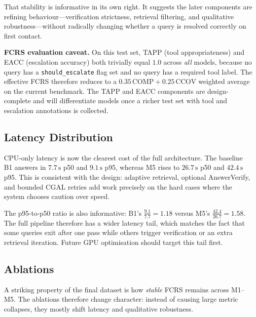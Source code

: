 \documentclass[11pt,a4paper,twocolumn]{article}
\begin{document}
That stability is informative in its own right. It suggests the later
components are refining behaviour---verification strictness, retrieval
filtering, and qualitative robustness---without radically changing whether a
query is resolved correctly on first contact.

\textbf{FCRS evaluation caveat.} On this test set, TAPP (tool
appropriateness) and EACC (escalation accuracy) both trivially equal
$1.0$ across \emph{all} models, because no query has a
\texttt{should\_escalate} flag set and no query has a required tool
label. The effective FCRS therefore reduces to a
$0.35\,\text{COMP}+0.25\,\text{CCOV}$ weighted average on the current
benchmark. The TAPP and EACC components are design-complete and will
differentiate models once a richer test set with tool and escalation
annotations is collected.

\subsection{Latency Distribution}

CPU-only latency is now the clearest cost of the full architecture.
The baseline B1 answers in $7.7\,\text{s}$ p50 and $9.1\,\text{s}$ p95,
whereas M5 rises to $26.7\,\text{s}$ p50 and $42.4\,\text{s}$ p95. This is
consistent with the design: adaptive retrieval, optional AnswerVerify, and
bounded CGAL retries add work precisely on the hard cases where the system
chooses caution over speed.

The p95-to-p50 ratio is also informative: B1's
$\frac{9.1}{7.7}=1.18$ versus M5's $\frac{42.4}{26.7}=1.58$. The full
pipeline therefore has a wider latency tail, which matches the fact that
some queries exit after one pass while others trigger verification or an
extra retrieval iteration. Future GPU optimisation should target this tail
first.

\subsection{Ablations}

A striking property of the final dataset is how \emph{stable} FCRS remains
across M1--M5. The ablations therefore change character: instead of causing
large metric collapses, they mostly shift latency and qualitative
robustness.
\end{document}
